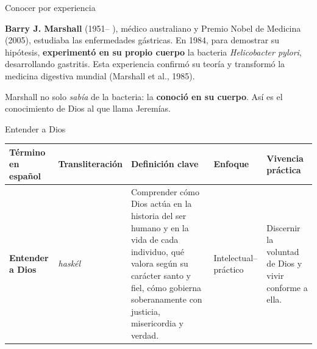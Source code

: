 \documentclass[hyperref={bookmarks=false},aspectratio=169]{beamer}
\newcommand{\destacar}[1]{\textbf{\textcolor{azulp}{#1}}}
\begin{document}
\begin{frame}{Conocer por experiencia}
\begin{tcolorbox}[colback=azulcl,colframe=azulp,boxrule=1pt,arc=3pt,fontupper=\small]
\textbf{Barry J. Marshall} (1951– ), médico australiano y Premio Nobel de Medicina (2005), estudiaba las enfermedades gástricas. En 1984, para demostrar su hipótesis, \destacar{experimentó en su propio cuerpo} la bacteria \emph{Helicobacter pylori}, desarrollando gastritis. Esta experiencia confirmó su teoría y transformó la medicina digestiva mundial (Marshall et al., 1985).
\end{tcolorbox}
\vspace{4pt}
\small Marshall no solo \emph{sabía} de la bacteria: la \destacar{conoció en su cuerpo}. Así es el conocimiento de Dios al que llama Jeremías.
\end{frame}

\begin{frame}{Entender a Dios}
\scriptsize
\begin{tabular}{@{}P{1.6cm} P{1.5cm} P{3.8cm} P{1.4cm} P{2.2cm}@{}}
\toprule
\textbf{Término en español} & \textbf{Transliteración} & \textbf{Definición clave} & \textbf{Enfoque} & \textbf{Vivencia práctica} \\ \midrule
\destacar{Entender a Dios} & \emph{haskél} & Comprender cómo Dios actúa en la historia del ser humano y en la vida de cada individuo, qué valora según su carácter santo y fiel, cómo gobierna soberanamente con justicia, misericordia y verdad. & Intelectual–práctico & Discernir la voluntad de Dios y vivir conforme a ella. \\ \bottomrule
\end{tabular}
\end{frame}
\end{document}
